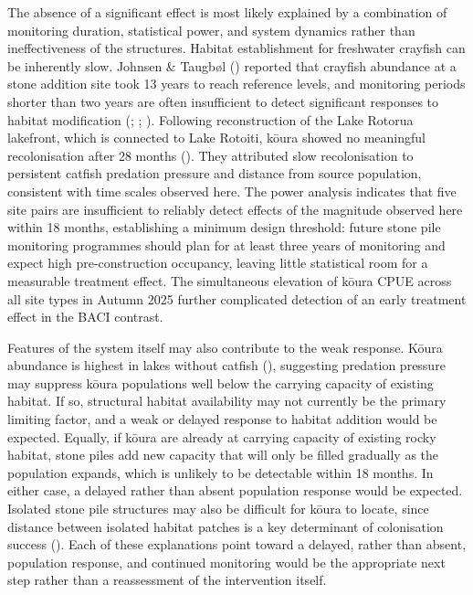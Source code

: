 \documentclass[
  letterpaper,
  DIV=11,
  numbers=noendperiod]{scrartcl}
\begin{document}
The absence of a significant effect is most likely explained by a
combination of monitoring duration, statistical power, and system
dynamics rather than ineffectiveness of the structures. Habitat
establishment for freshwater crayfish can be inherently slow. Johnsen \&
Taugbøl () reported that crayfish
abundance at a stone addition site took 13 years to reach reference
levels, and monitoring periods shorter than two years are often
insufficient to detect significant responses to habitat modification
(;
;
). Following
reconstruction of the Lake Rotorua lakefront, which is connected to Lake
Rotoiti, kōura showed no meaningful recolonisation after 28 months
(). They attributed slow
recolonisation to persistent catfish predation pressure and distance
from source population, consistent with time scales observed here. The
power analysis indicates that five site pairs are insufficient to
reliably detect effects of the magnitude observed here within 18 months,
establishing a minimum design threshold: future stone pile monitoring
programmes should plan for at least three years of monitoring and expect
high pre-construction occupancy, leaving little statistical room for a
measurable treatment effect. The simultaneous elevation of kōura CPUE
across all site types in Autumn 2025 further complicated detection of an
early treatment effect in the BACI contrast.

Features of the system itself may also contribute to the weak response.
Kōura abundance is highest in lakes without catfish
(), suggesting
predation pressure may suppress kōura populations well below the
carrying capacity of existing habitat. If so, structural habitat
availability may not currently be the primary limiting factor, and a
weak or delayed response to habitat addition would be expected. Equally,
if kōura are already at carrying capacity of existing rocky habitat,
stone piles add new capacity that will only be filled gradually as the
population expands, which is unlikely to be detectable within 18 months.
In either case, a delayed rather than absent population response would
be expected. Isolated stone pile structures may also be difficult for
kōura to locate, since distance between isolated habitat patches is a
key determinant of colonisation success
(). Each of these explanations
point toward a delayed, rather than absent, population response, and
continued monitoring would be the appropriate next step rather than a
reassessment of the intervention itself.
\end{document}
